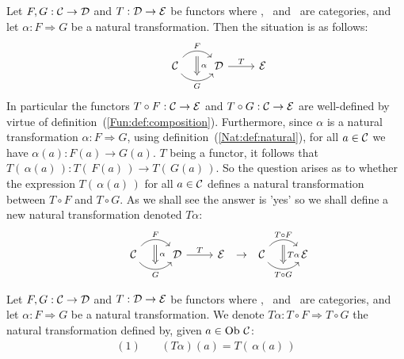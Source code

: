 Let $F,G:\mbox{$\cal C$}\to\mbox{$\cal D$}$ and $T:\mbox{$\cal D$}\to\mbox{$\cal E$}$ be functors where \Cat, \Dat\ and \Eat\ 
are categories, and let $\alpha:F\Rightarrow G$ be a natural 
transformation. Then the situation is as follows: 
    \[
        \begin{tikzcd}
            & \Cat \arrow[r, "F", bend left  = 50, ""{name=U, below}]
                 \arrow[r, swap, "G", bend right = 50, ""{name=D, above}]
            & \Dat 
            \arrow[Rightarrow, "\,\alpha", from = U, to = D]
            \arrow[r,"T"]
            & \Eat
        \end{tikzcd}
    \] 
In particular the functors $T\circ F:\mbox{$\cal C$}\to\mbox{$\cal E$}$ and $T\circ G:\mbox{$\cal C$}\to\mbox{$\cal E$}$
are well-defined by virtue of definition~(\ref{Fun:def:composition}). Furthermore, 
since $\alpha$ is a natural transformation $\alpha:F\Rightarrow G$,
using definition~(\ref{Nat:def:natural}), for all $a\in\mbox{$\cal C$}$ we have 
$\alpha(a):F(a)\to G(a)$. $T$ being a functor, it follows that 
$T(\,\alpha(a)\,) : T(\,F(a)\,)\to T(\,G(a)\,)$. So the question arises 
as to whether the expression $T(\,\alpha(a)\,)$ for all $a\in\mbox{$\cal C$}$ defines 
a natural transformation between $T\circ F$ and $T\circ G$. As we shall see the 
answer is 'yes' so we shall define a new natural transformation denoted 
$T\alpha$:
    \[
        \begin{tikzcd}
            & \Cat \arrow[r, "F", bend left  = 50, ""{name=U, below}]
                 \arrow[r, swap, "G", bend right = 50, ""{name=D, above}]
            & \Dat
            \arrow[Rightarrow, "\,\alpha", from = U, to = D]
            \arrow[r,"T"]
            & \Eat
        \end{tikzcd}
        \ \to\ 
        \begin{tikzcd}
            \Cat \arrow[r, "T\circ F", bend left  = 50, ""{name=U, below}]
                 \arrow[r, swap, "T\circ G", bend right = 50, ""{name=D, above}]
            & \Eat
            \arrow[Rightarrow, "\,T\alpha", from = U, to = D]
        \end{tikzcd}
    \]
\begin{defin}\label{Nat:def:leftmul}
    Let $F,G:\mbox{$\cal C$}\to\mbox{$\cal D$}$ and $T:\mbox{$\cal D$}\to\mbox{$\cal E$}$ be functors where \Cat, \Dat\ 
    and \Eat\ are categories, and let $\alpha:F\Rightarrow G$ be a natural 
    transformation. We denote $T\alpha: T\circ F\Rightarrow T\circ G$ the 
    natural transformation defined by, given $a\in\mbox{\rm Ob}\ \mbox{$\cal C$}$:
        \begin{eqnarray*}
            (1)&\ &(T\alpha)(a) = T(\,\alpha(a)\,)
        \end{eqnarray*}
\end{defin}  

